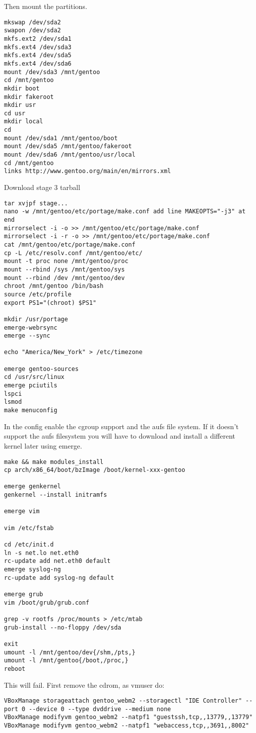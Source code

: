 \documentclass[a4paper]{book}
\begin{document}
Then mount the partitions.
\begin{verbatim}
mkswap /dev/sda2
swapon /dev/sda2
mkfs.ext2 /dev/sda1
mkfs.ext4 /dev/sda3
mkfs.ext4 /dev/sda5
mkfs.ext4 /dev/sda6
mount /dev/sda3 /mnt/gentoo
cd /mnt/gentoo
mkdir boot
mkdir fakeroot
mkdir usr
cd usr
mkdir local
cd
mount /dev/sda1 /mnt/gentoo/boot
mount /dev/sda5 /mnt/gentoo/fakeroot
mount /dev/sda6 /mnt/gentoo/usr/local
cd /mnt/gentoo
links http://www.gentoo.org/main/en/mirrors.xml
\end{verbatim}
Download stage 3 tarball
\begin{verbatim}
tar xvjpf stage...
nano -w /mnt/gentoo/etc/portage/make.conf add line MAKEOPTS="-j3" at end
mirrorselect -i -o >> /mnt/gentoo/etc/portage/make.conf
mirrorselect -i -r -o >> /mnt/gentoo/etc/portage/make.conf
cat /mnt/gentoo/etc/portage/make.conf
cp -L /etc/resolv.conf /mnt/gentoo/etc/
mount -t proc none /mnt/gentoo/proc
mount --rbind /sys /mnt/gentoo/sys
mount --rbind /dev /mnt/gentoo/dev
chroot /mnt/gentoo /bin/bash
source /etc/profile
export PS1="(chroot) $PS1"

mkdir /usr/portage
emerge-webrsync
emerge --sync

echo "America/New_York" > /etc/timezone

emerge gentoo-sources
cd /usr/src/linux
emerge pciutils
lspci
lsmod
make menuconfig
\end{verbatim}
In the config enable the cgroup support and the aufs file system. If it doesn't support the aufs filesystem you will have to download and install a different kernel later using emerge.

\begin{verbatim}
make && make modules_install
cp arch/x86_64/boot/bzImage /boot/kernel-xxx-gentoo

emerge genkernel
genkernel --install initramfs

emerge vim

vim /etc/fstab

cd /etc/init.d
ln -s net.lo net.eth0
rc-update add net.eth0 default
emerge syslog-ng
rc-update add syslog-ng default

emerge grub
vim /boot/grub/grub.conf

grep -v rootfs /proc/mounts > /etc/mtab
grub-install --no-floppy /dev/sda

exit
umount -l /mnt/gentoo/dev{/shm,/pts,}
umount -l /mnt/gentoo{/boot,/proc,}
reboot
\end{verbatim}

This will fail. First remove the cdrom, as vmuser do:
\begin{verbatim}
VBoxManage storageattach gentoo_webm2 --storagectl "IDE Controller" --port 0 --device 0 --type dvddrive --medium none
VBoxManage modifyvm gentoo_webm2 --natpf1 "guestssh,tcp,,13779,,13779"
VBoxManage modifyvm gentoo_webm2 --natpf1 "webaccess,tcp,,3691,,8002"
\end{verbatim}
\end{document}
